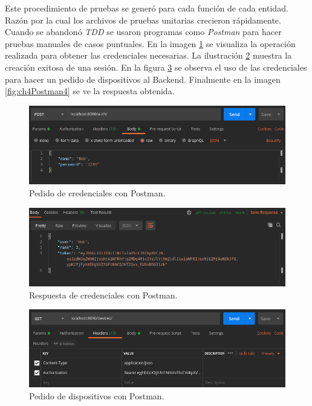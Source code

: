 Este procedimiento de pruebas se generó para cada función de cada entidad.
Razón por la cual los archivos de pruebas unitarias crecieron rápidamente.
Cuando se abandonó \emph{TDD} se usaron programas como \emph{Postman} para hacer pruebas manuales de casos puntuales.
En la imagen \ref{fig:ch4Postman1} se visualiza la operación realizada para obtener las credenciales necesarias.
La ilustración \ref{fig:ch4Postman2} muestra la creación exitosa de una sesión.
En la figura \ref{fig:ch4Postman3} se observa el uso de las credenciales para hacer un pedido de dispositivos al Backend.
Finalmente en la imagen \ref{fig:ch4Postman4} se ve la respuesta obtenida. 


\begin{figure}[h]
	\centering
	\includegraphics[width=\textwidth]{./Figures/postman1.png}
	\caption{Pedido de credenciales con Postman.}
	\label{fig:ch4Postman1}
\end{figure}

\begin{figure}[h]
	\centering
	\includegraphics[width=\textwidth]{./Figures/postman2.png}
	\caption{Respuesta de credenciales con Postman.}
	\label{fig:ch4Postman2}
\end{figure}

\begin{figure}[h]
	\centering
	\includegraphics[width=\textwidth]{./Figures/postman3.png}
	\caption{Pedido de dispositivos con Postman.}
	\label{fig:ch4Postman3}
\end{figure}

